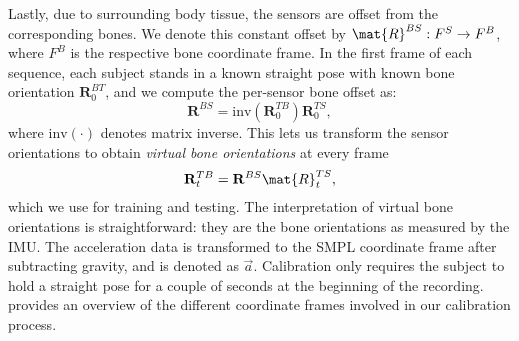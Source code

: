 \documentclass[acmtog]{acmart}
\begin{document}
Lastly, due to surrounding body tissue, the sensors are offset from the corresponding bones. We denote this constant offset by $\mat{R}^{BS}: F^S \rightarrow F^B$, where $F^B$ is the respective bone coordinate frame. In the first frame of each sequence, each subject stands in a known straight pose with known bone orientation $\mathbf{R}^{BT}_0$, and we compute the per-sensor bone offset as:
\begin{equation}
\mathbf{R}^{BS} = \mathrm{inv}(\mathbf{R}^{TB}_0)\mathbf{R}^{TS}_0,
\end{equation}
where $\mathrm{inv}(\cdot)$ denotes matrix inverse. This lets us transform the sensor orientations to obtain \emph{virtual bone orientations} at every frame 
\begin{equation}
\mathbf{R}^{TB}_t = \mathbf{R}^{BS}\mat{R}^{TS}_t , \label{eq:virtual_bone_orientations}
\end{equation}
which we use for training and testing. The interpretation of virtual bone orientations is straightforward: they are the bone orientations as measured by the IMU. The acceleration data is transformed to the SMPL coordinate frame after subtracting gravity, and is denoted as $\vec{a}$. Calibration only requires the subject to hold a straight pose for a couple of seconds at the beginning of the recording.  provides an overview of the different coordinate frames involved in our calibration process. 
\end{document}
